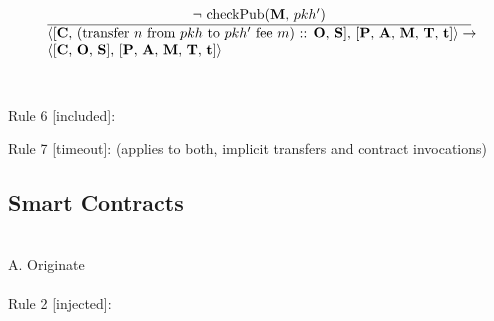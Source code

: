 \documentclass[a4paper]{llncs}
\begin{document}
\begin{equation}{}
\frac{\text{$\neg$ checkPub(\MANAGERS, $pkh'$)}}{\parbox{4.2in}{\text{$\langle$[\ACCOUNTS, (transfer $n$ from $pkh$ to $pkh'$ fee $m$) :: \OPERATIONS, \CONTRACTS], [\PENDING, \ACCEPTED, \MANAGERS, \CONTRACTORS, \TIME]$\rangle \rightarrow$ }\\
\text{$\langle$[\ACCOUNTS, \OPERATIONS, \CONTRACTS], [\PENDING, \ACCEPTED, \MANAGERS, \CONTRACTORS, \TIME]$\rangle$}}} 
\end{equation}
~\\
~\\
Rule 6 [included]:
\begin{mathpar}
\end{mathpar}
Rule 7 [timeout]: (applies to both, implicit transfers and contract invocations)
\begin{mathpar}
\end{mathpar}

\subsection{Smart Contracts}
~\\
A. Originate
~\\
~\\

Rule 2 [injected]:
\end{document}
